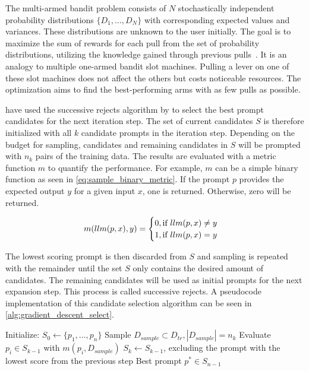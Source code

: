 The multi-armed bandit problem consists of $N$ stochastically independent probability distributions $\{ D_1, \dots, D_N\}$ with corresponding expected values and variances.
These distributions are unknown to the user initially.
The goal is to maximize the sum of rewards for each pull from the set of probability distributions, utilizing the knowledge gained through previous pulls~\cite{kuleshov2014AlgorithmsMultiarmeda}.
It is an analogy to multiple one-armed bandit slot machines.
Pulling a lever on one of these slot machines does not affect the others but costs noticeable resources.
The optimization aims to find the best-performing arms with as few pulls as possible.

\citeauthor{pryzant2023AutomaticPrompt} have used the successive rejects algorithm by  to select the best prompt candidates for the next iteration step.
The set of current candidates $S$ is therefore initialized with all $k$ candidate prompts in the iteration step.
Depending on the budget for sampling, candidates and remaining candidates in $S$ will be prompted with $n_k$ pairs of the training data.
The results are evaluated with a metric function $m$ to quantify the performance.
For example, $m$ can be a simple binary function as seen in \autoref{eq:sample_binary_metric}.
If the prompt $p$ provides the expected output $y$ for a given input $x$, one is returned.
Otherwise, zero will be returned.

\begin{equation}
\label{eq:sample_binary_metric}
    m(llm(p, x), y) = 
    \begin{cases}
        0, \text{if $llm(p, x) \neq y$}\\
        1, \text{if $llm(p, x) = y$}
    \end{cases}
\end{equation}

The lowest scoring prompt is then discarded from $S$ and sampling is repeated with the remainder until the set $S$ only contains the desired amount of candidates.
The remaining candidates will be used as initial prompts for the next expansion step.
This process is called successive rejects.
A pseudocode implementation of this candidate selection algorithm can be seen in \autoref{alg:gradient_descent_select}.


\begin{algorithm}
\caption{}
\label{alg:gradient_descent_select}
\begin{algorithmic}[1]
    \State Initialize: $S_0 \gets \{p_1, \dots , p_n\}$
        \State Sample $D_{sample} \subset D_{tr}, |D_{sample}| = n_k$
        \State Evaluate $p_i \in S_{k-1}$ with $m(p_i, D_{sample})$
        \State $S_k \gets S_{k-1}$, excluding the prompt with the lowest score from the previous step
    \EndFor
    \State \Return Best prompt $p^* \in S_{n-1}$
\end{algorithmic}
\end{algorithm}